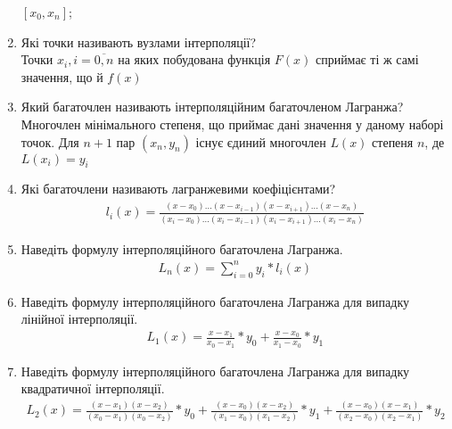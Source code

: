 \begin{enumerate}
          $[x_0, x_n]$;
    \item Які точки називають вузлами інтерполяції? \\
          Точки $x_i, i = \overline{0, n}$ на яких побудована функція $F(x)$
          сприймає ті ж самі значення, що й $f(x)$
    \item Який багаточлен називають інтерполяційним багаточленом Лагранжа? \\
          Многочлен мінімального степеня, що приймає дані значення у даному наборі точок.
          Для $n + 1$ пар $(x_n, y_n)$ існує єдиний многочлен $L(x)$ степеня $n$,
          де $L(x_i) = y_i$
    \item Які багаточлени називають лагранжевими коефіцієнтами?
          \begin{align}
              l_i(x) = \frac{
                  (x - x_0) \dots (x - x_{i - 1})(x - x_{i + 1}) \dots (x - x_n)
              }{
                  (x_i - x_0) \dots (x_i - x_{i - 1})(x_i - x_{i + 1}) \dots (x_i - x_n)
              }
          \end{align}
    \item Наведіть формулу інтерполяційного багаточлена Лагранжа.
          \begin{align}
              L_n(x) = \sum_{i = 0}^n y_i * l_i(x)
          \end{align}
    \item Наведіть формулу інтерполяційного багаточлена Лагранжа
          для випадку лінійної інтерполяції.
          \begin{align}
              L_1(x)
              = \frac{x - x_1}{x_0 - x_1} * y_0
              + \frac{x - x_0}{x_1 - x_0} * y_1
          \end{align}
    \item Наведіть формулу інтерполяційного багаточлена Лагранжа
          для випадку квадратичної інтерполяції.
          \begin{align}
              L_2(x)
              = \frac{(x - x_1)(x - x_2)}{(x_0 - x_1)(x_0 - x_2)} * y_0
              + \frac{(x - x_0)(x - x_2)}{(x_1 - x_0)(x_1 - x_2)} * y_1
              + \frac{(x - x_0)(x - x_1)}{(x_2 - x_0)(x_2 - x_1)} * y_2
          \end{align}
\end{enumerate}
